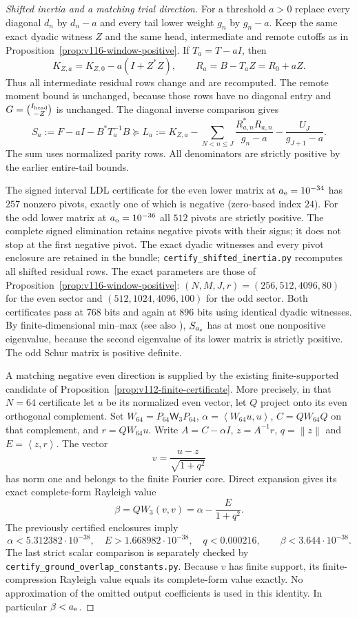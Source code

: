 \documentclass[11pt]{article}
\theoremstyle{remark}
\newcommand{\norm}[1]{\left\lVert #1\right\rVert}
\newcommand{\ip}[2]{\left\langle #1,#2\right\rangle}
\begin{document}
\begin{proof}[Shifted inertia and a matching trial direction]
For a threshold $a>0$ replace every diagonal $d_n$ by $d_n-a$ and
every tail lower weight $g_n$ by $g_n-a$.  Keep the same exact dyadic
witness $Z$ and the same head, intermediate and remote cutoffs as in
Proposition~\ref{prop:v116-window-positive}.  If $T_a=T-aI$, then
\[
 K_{Z,a}=K_{Z,0}-a(I+Z^*Z),\qquad
 R_a=B-T_aZ=R_0+aZ.
\]
Thus all intermediate residual rows change and are recomputed.  The
remote moment bound is unchanged, because those rows have no diagonal
entry and $G=\binom{I_{\rm head}}{-Z}$ is unchanged.  The diagonal inverse comparison gives
\[
 S_a:=F-aI-B^*T_a^{-1}B\succeq
 L_a:=K_{Z,a}-\sum_{N<n\le J}\frac{R_{a,n}^*R_{a,n}}{g_n-a}
                      -\frac{U_J}{g_{J+1}-a}.
\]
The sum uses normalized parity rows.  All denominators are strictly
positive by the earlier entire-tail bounds.

The signed interval LDL certificate for the even lower matrix at
$a_{\rm e}=10^{-34}$ has $257$ nonzero pivots, exactly one of which
is negative (zero-based index $24$).  For the odd lower matrix at
$a_{\rm o}=10^{-36}$ all $512$ pivots are strictly positive.
The complete signed elimination retains negative pivots with their
signs; it does not stop at the first negative pivot.  The exact dyadic
witnesses and every pivot enclosure are retained in the bundle;
\texttt{certify\_shifted\_inertia.py} recomputes all shifted residual rows.
The exact parameters are those of Proposition~\ref{prop:v116-window-positive}:
$(N,M,J,r)=(256,512,4096,80)$ for the even sector and
$(512,1024,4096,100)$ for the odd sector. Both certificates pass
at 768 bits and again at 896 bits using identical dyadic witnesses.
By finite-dimensional min--max (see also \cite[Section~4.3]{Teschl2009}), $S_{a_{\rm e}}$ has at most one
nonpositive eigenvalue, because the second eigenvalue of its lower
matrix is strictly positive.  The odd Schur matrix is positive definite.

A matching negative even direction is supplied by the existing
finite-supported candidate of
Proposition~\ref{prop:v112-finite-certificate}. More precisely, in that
$N=64$ certificate let $u$ be its normalized even vector, let $Q$ project
onto its even orthogonal complement. Set
$W_{64}=P_{64}\mathsf W_3P_{64}$, $\alpha=\ip{W_{64}u}{u}$,
$C=QW_{64}Q$ on that complement, and $r=QW_{64}u$. Write $A=C-\alpha I$, $z=A^{-1}r$, $q=\norm z$ and
$E=\ip zr$.  The vector
\[
 v=\frac{u-z}{\sqrt{1+q^2}}
\]
has norm one and belongs to the finite Fourier core.  Direct expansion
gives its exact complete-form Rayleigh value
\[
 \beta=QW_3(v,v)=\alpha-\frac{E}{1+q^2}.
\]
The previously certified enclosures imply
\[
 \alpha<5.312382\cdot10^{-38},\quad
 E>1.668982\cdot10^{-38},\quad q<0.000216,
 \qquad \beta<3.644\cdot10^{-38}.
\]
The last strict scalar comparison is separately checked by
\texttt{certify\_ground\_overlap\_constants.py}.  Because $v$ has
finite support, its finite-compression Rayleigh value equals its
complete-form value exactly.  No approximation of the omitted output
coefficients is used in this identity.  In particular $\beta<a_{\rm e}$.


\end{proof}
\end{document}
